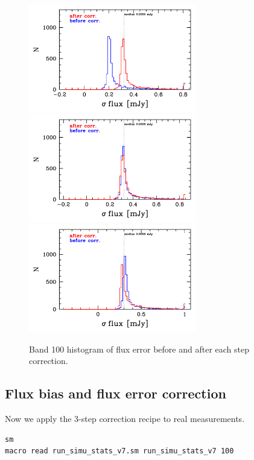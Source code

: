 \documentclass[11pt,a4paper]{article}
\begin{document}
\begin{figure}[H]
	\caption{
		Band 100 histogram of flux error before and after each step correction. 
	}
	\includegraphics[width=0.65\textwidth]{galsim_100_hist_uncertainty_1}
	\includegraphics[width=0.65\textwidth]{galsim_100_hist_uncertainty_2}
	\includegraphics[width=0.65\textwidth]{galsim_100_hist_uncertainty_3}
\end{figure}


\subsection{Flux bias and flux error correction}
\label{Band100_dfcorr}

Now we apply the 3-step correction recipe to real measurements. 

\begin{lstlisting}[language=bash]
sm
macro read run_simu_stats_v7.sm run_simu_stats_v7 100
\end{lstlisting}
\end{document}

